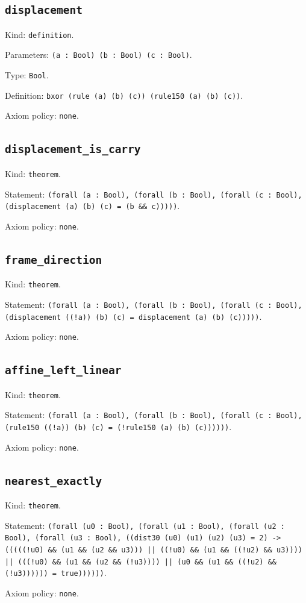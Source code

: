 \documentclass[11pt]{article}
\begin{document}
\subsection*{\texttt{displacement}}
\noindent Kind: \texttt{definition}.\par
\noindent Parameters: \texttt{(a : Bool) (b : Bool) (c : Bool)}.\par
\noindent Type: \texttt{Bool}.\par
\noindent Definition: \texttt{bxor (rule (a) (b) (c)) (rule150 (a) (b) (c))}.\par
\noindent Axiom policy: \texttt{none}.\par
\subsection*{\texttt{displacement\_is\_carry}}
\noindent Kind: \texttt{theorem}.\par
\noindent Statement: \texttt{(forall (a : Bool), (forall (b : Bool), (forall (c : Bool), (displacement (a) (b) (c) = (b \&\& c)))))}.\par
\noindent Axiom policy: \texttt{none}.\par
\subsection*{\texttt{frame\_direction}}
\noindent Kind: \texttt{theorem}.\par
\noindent Statement: \texttt{(forall (a : Bool), (forall (b : Bool), (forall (c : Bool), (displacement ((!a)) (b) (c) = displacement (a) (b) (c)))))}.\par
\noindent Axiom policy: \texttt{none}.\par
\subsection*{\texttt{affine\_left\_linear}}
\noindent Kind: \texttt{theorem}.\par
\noindent Statement: \texttt{(forall (a : Bool), (forall (b : Bool), (forall (c : Bool), (rule150 ((!a)) (b) (c) = (!rule150 (a) (b) (c))))))}.\par
\noindent Axiom policy: \texttt{none}.\par
\subsection*{\texttt{nearest\_exactly}}
\noindent Kind: \texttt{theorem}.\par
\noindent Statement: \texttt{(forall (u0 : Bool), (forall (u1 : Bool), (forall (u2 : Bool), (forall (u3 : Bool), ((dist30 (u0) (u1) (u2) (u3) = 2) -> (((((!u0) \&\& (u1 \&\& (u2 \&\& u3))) || ((!u0) \&\& (u1 \&\& ((!u2) \&\& u3)))) || (((!u0) \&\& (u1 \&\& (u2 \&\& (!u3)))) || (u0 \&\& (u1 \&\& ((!u2) \&\& (!u3)))))) = true))))))}.\par
\noindent Axiom policy: \texttt{none}.\par
\end{document}
